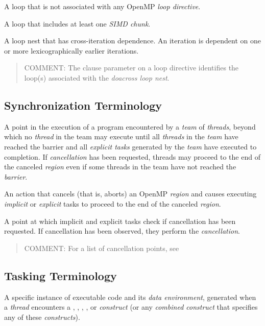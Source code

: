 \glossarydefstart
A loop that is not associated with any OpenMP \emph{loop directive}.
\glossarydefend

\glossarydefstart
A loop that includes at least one \emph{SIMD chunk}.
\glossarydefend

\glossarydefstart
A loop nest that has cross-iteration dependence. An iteration is dependent on one or more lexicographically earlier iterations.
\begin{quote}
COMMENT: The  clause parameter on a loop directive identifies the loop(s) associated with the \emph{doacross loop nest}.
\end{quote}
\glossarydefend

%
%
\subsection{Synchronization Terminology}
\glossarydefstart
A point in the execution of a program encountered by a \emph{team} of \emph{threads}, beyond 
which no \emph{thread} in the team may execute until all \emph{threads} in the \emph{team} have 
reached the barrier and all \emph{explicit tasks} generated by the \emph{team} have executed to 
completion. If \emph{cancellation} has been requested, threads may proceed to the end of 
the canceled \emph{region} even if some threads in the team have not reached the \emph{barrier}.
\glossarydefend

\glossarydefstart
An action that cancels (that is, aborts) an OpenMP \emph{region} and causes executing 
\emph{implicit} or \emph{explicit} tasks to proceed to the end of the canceled \emph{region}. 
\glossarydefend

\glossarydefstart
A point at which implicit and explicit tasks check if cancellation has been 
requested. If cancellation has been observed, they perform the \emph{cancellation}. 

\begin{quote}
COMMENT: For a list of cancellation points, see 
\end{quote}
\glossarydefend
\bigskip







\subsection{Tasking Terminology}
\label{subsec:Tasking Terminology}
\glossarydefstart
A specific instance of executable code and its \emph{data environment}, generated when a 
\emph{thread} encounters a , , , , or
 \emph{construct} (or any \emph{combined construct} that specifies
any of these \emph{constructs}).
\glossarydefend

